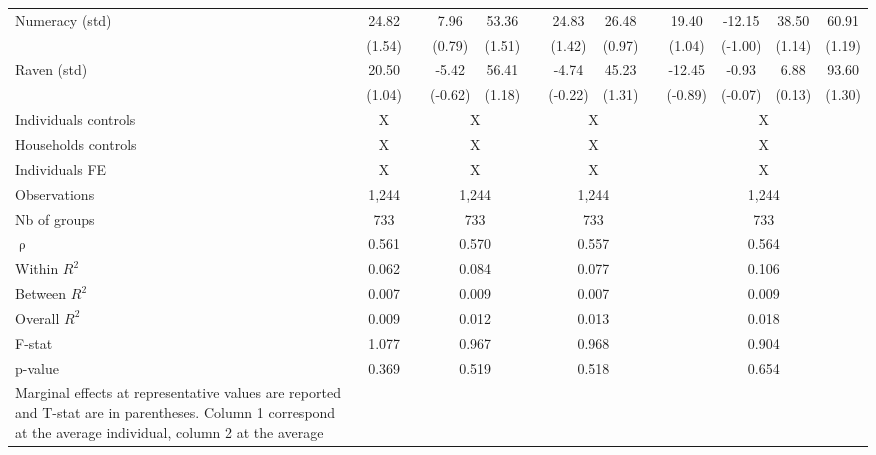 \begin{table}[!h]
{\begin{tabular}{lcccccccccccc}
    Numeracy (std) & 24.82 &   & 7.96 & 53.36 &   & 24.83 & 26.48 &   & 19.40 & -12.15 & 38.50 & 60.91 \\
      & (1.54) &   & (0.79) & (1.51) &   & (1.42) & (0.97) &   & (1.04) & (-1.00) & (1.14) & (1.19) \\
    Raven (std) & 20.50 &   & -5.42 & 56.41 &   & -4.74 & 45.23 &   & -12.45 & -0.93 & 6.88 & 93.60 \\
      & (1.04) &   & (-0.62) & (1.18) &   & (-0.22) & (1.31) &   & (-0.89) & (-0.07) & (0.13) & (1.30) \\
\cmidrule{1-2}\cmidrule{4-5}\cmidrule{7-8}\cmidrule{10-13}
    Individuals controls & X     &       & \multicolumn{2}{c}{X} &       & \multicolumn{2}{c}{X} &       & \multicolumn{4}{c}{X} \\
    Households controls & X     &       & \multicolumn{2}{c}{X} &       & \multicolumn{2}{c}{X} &       & \multicolumn{4}{c}{X} \\
    Individuals FE & X     &       & \multicolumn{2}{c}{X} &       & \multicolumn{2}{c}{X} &       & \multicolumn{4}{c}{X} \\
    \midrule
    Observations & 1,244  &       & \multicolumn{2}{c}{1,244} &       & \multicolumn{2}{c}{1,244} &       & \multicolumn{4}{c}{1,244} \\
    Nb of groups & 733   &       & \multicolumn{2}{c}{733} &       & \multicolumn{2}{c}{733} &       & \multicolumn{4}{c}{733} \\
    $\uprho$ & 0.561 &       & \multicolumn{2}{c}{0.570} &       & \multicolumn{2}{c}{0.557} &       & \multicolumn{4}{c}{0.564} \\
    Within $R^2$ & 0.062 &       & \multicolumn{2}{c}{0.084} &       & \multicolumn{2}{c}{0.077} &       & \multicolumn{4}{c}{0.106} \\
    Between $R^2$ & 0.007 &       & \multicolumn{2}{c}{0.009} &       & \multicolumn{2}{c}{0.007} &       & \multicolumn{4}{c}{0.009} \\
    Overall $R^2$ & 0.009 &       & \multicolumn{2}{c}{0.012} &       & \multicolumn{2}{c}{0.013} &       & \multicolumn{4}{c}{0.018} \\
    F-stat & 1.077 &       & \multicolumn{2}{c}{0.967} &       & \multicolumn{2}{c}{0.968} &       & \multicolumn{4}{c}{0.904} \\
    p-value & 0.369 &       & \multicolumn{2}{c}{0.519} &       & \multicolumn{2}{c}{0.518} &       & \multicolumn{4}{c}{0.654} \\
    \bottomrule
	\Tablenote{13}{
	Marginal effects at representative values are reported and T-stat are in parentheses. Column 1 correspond at the average individual, column 2 at the average \\ 
}
\end{tabular}}
\end{table}

